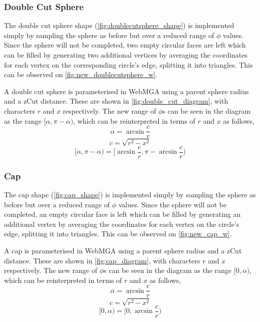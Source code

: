 
\subsubsection{Double Cut Sphere}
The double cut sphere shape (\cref{fig:doublecutsphere_shape}) is implemented simply by sampling the sphere as before but over a reduced range of $\phi$ values. Since the sphere will not be completed, two empty circular faces are left which can be filled by generating two additional vertices by averaging the coordinates for each vertex on the corresponding circle's edge, splitting it into triangles. This can be observed on \cref{fig:new_doublecutsphere_w}.

A double cut sphere is parameterised in WebMGA using a parent sphere radius and a zCut distance. These are shown in \cref{fig:double_cut_diagram}, with characters $r$ and $x$ respectively. The new range of $\phi$s can be seen in the diagram as the range $[\alpha,\pi-\alpha)$, which can be reinterpreted in terms of $r$ and $x$ as follows,
\begin{equation}
\alpha=\arcsin\frac{c}{r}
\end{equation}
\begin{equation}
c=\sqrt{r^2-x^2}
\end{equation}
\begin{equation}
[\alpha,\pi-\alpha)=[\arcsin\frac{c}{r},\pi - \arcsin\frac{c}{r})
\end{equation}

\subsubsection{Cap}
\label{cap_section}
The cap shape (\cref{fig:cap_shape}) is implemented simply by sampling the sphere as before but over a reduced range of $\phi$ values. Since the sphere will not be completed, an empty circular face is left which can be filled by generating an additional vertex by averaging the coordinates for each vertex on the circle's edge, splitting it into triangles. This can be observed on \cref{fig:new_cap_w}.

A cap is parameterised in WebMGA using a parent sphere radius and a zCut distance. These are shown in \cref{fig:cap_diagram}, with characters $r$ and $x$ respectively. The new range of $\phi$s can be seen in the diagram as the range $[0,\alpha)$, which can be reinterpreted in terms of $r$ and $x$ as follows,
\begin{equation}
\alpha=\arcsin\frac{c}{r}
\end{equation}
\begin{equation}
c=\sqrt{r^2-x^2}
\end{equation}
\begin{equation}
[0, \alpha)=[0, \arcsin\frac{c}{r})
\end{equation}

